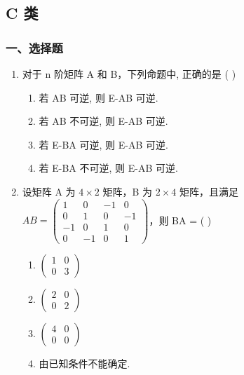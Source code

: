 \documentclass[12pt, a4paper]{ctexart}
\begin{document}
\subsection{C 类}

\subsubsection*{一、选择题}

\begin{enumerate}
    \item 对于 n 阶矩阵 A 和 B，下列命题中, 正确的是 ( \underline{\hspace{1cm}} )
    \begin{enumerate}[label=(\Alph*)]
        \item 若 AB 可逆, 则 E-AB 可逆.
        \item 若 AB 不可逆, 则 E-AB 可逆.
        \item 若 E-BA 可逆, 则 E-AB 可逆.
        \item 若 E-BA 不可逆, 则 E-AB 可逆.
    \end{enumerate}

    \item 设矩阵 A 为 $ 4 \times 2 $ 矩阵，B 为 $ 2 \times 4 $ 矩阵，且满足 $ AB = \begin{pmatrix} 1 & 0 & -1 & 0 \\ 0 & 1 & 0 & -1 \\ -1 & 0 & 1 & 0 \\ 0 & -1 & 0 & 1 \end{pmatrix} $，则 BA = ( \underline{\hspace{1cm}} )
    \begin{enumerate}[label=(\Alph*)]
        \item $ \begin{pmatrix}1 & 0 \\ 0 & 3\end{pmatrix} $
        \item $ \begin{pmatrix}2 & 0 \\ 0 & 2\end{pmatrix} $
        \item $ \begin{pmatrix}4 & 0 \\ 0 & 0\end{pmatrix} $
        \item 由已知条件不能确定.
    \end{enumerate}


\end{enumerate}
\end{document}
